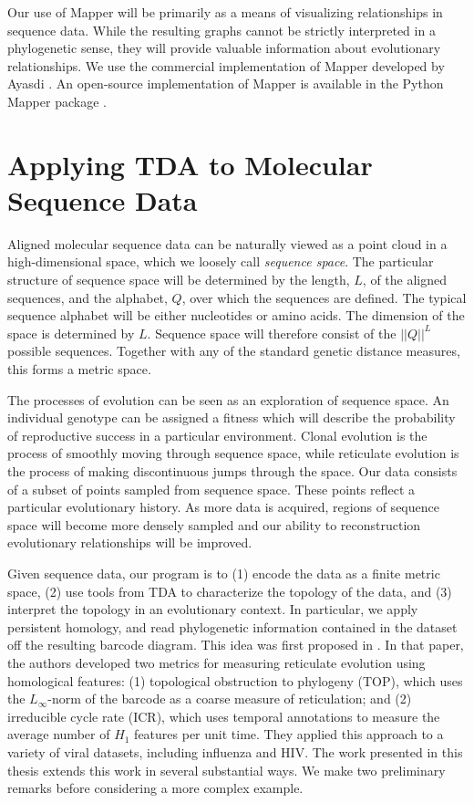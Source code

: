 Our use of Mapper will be primarily as a means of visualizing relationships in sequence data.
While the resulting graphs cannot be strictly interpreted in a phylogenetic sense, they will provide valuable information about evolutionary relationships.
We use the commercial implementation of Mapper developed by Ayasdi \cite{AyasdiIris:2015}.
An open-source implementation of Mapper is available in the Python Mapper package \cite{Mullner:2013}.

\section{Applying TDA to Molecular Sequence Data}
\label{bg:top4bio}

Aligned molecular sequence data can be naturally viewed as a point cloud in a high-dimensional space, which we loosely call \emph{sequence space}.
The particular structure of sequence space will be determined by the length, $L$, of the aligned sequences, and the alphabet, $Q$, over which the sequences are defined.
The typical sequence alphabet will be either nucleotides or amino acids.
The dimension of the space is determined by $L$.
Sequence space will therefore consist of the $||Q||^L$ possible sequences.
Together with any of the standard genetic distance measures, this forms a metric space.

The processes of evolution can be seen as an exploration of sequence space.
An individual genotype can be assigned a fitness which will describe the probability of reproductive success in a particular environment.
Clonal evolution is the process of smoothly moving through sequence space, while reticulate evolution is the process of making discontinuous jumps through the space.
Our data consists of a subset of points sampled from sequence space.
These points reflect a particular evolutionary history.
As more data is acquired, regions of sequence space will become more densely sampled and our ability to reconstruction evolutionary relationships will be improved.

Given sequence data, our program is to (1) encode the data as a finite metric space, (2) use tools from TDA to characterize the topology of the data, and (3) interpret the topology in an evolutionary context.
In particular, we apply persistent homology, and read phylogenetic information contained in the dataset off the resulting barcode diagram.
This idea was first proposed in \cite{Chan:2013}.
In that paper, the authors developed two metrics for measuring reticulate evolution using homological features: (1) topological obstruction to phylogeny (TOP), which uses the $L_{\infty}$-norm of the barcode as a coarse measure of reticulation; and (2) irreducible cycle rate (ICR), which uses temporal annotations to measure the average number of $H_1$ features per unit time.
They applied this approach to a variety of viral datasets, including influenza and HIV.
The work presented in this thesis extends this work in several substantial ways.
We make two preliminary remarks before considering a more complex example.

